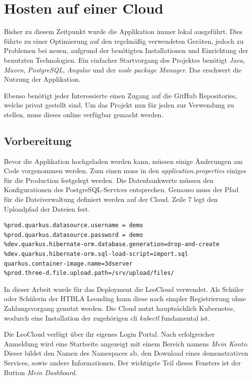 \section{Hosten auf einer Cloud}

Bisher zu diesem Zeitpunkt wurde die Applikation immer lokal ausgeführt. 
Dies führte zu einer Optimierung auf den regelmäßig verwendeten Geräten, jedoch zu Problemen bei neuen, aufgrund der benötigten Installationen und Einrichtung der benutzten Technologien. 
Ein einfacher Startvorgang des Projektes benötigt \emph{Java}, \emph{Maven}, \emph{PostgreSQL}, \emph{Angular} und der \emph{node package Manager}.
Das erschwert die Nutzung der Applikation. 

Ebenso benötigt jeder Interessierte einen Zugang auf die GitHub Repositories, welche privat gestellt sind. 
Um das Projekt nun für jeden zur Verwendung zu stellen, muss dieses online verfügbar gemacht werden. 

\subsection{Vorbereitung}

Bevor die Applikation hochgeladen werden kann, müssen einige Änderungen am Code vorgenommen werden. 
Zum einen muss in den \emph{application.properties} einiges für die Production festgelegt werden. 
Die Datenbankwerte müssen den Konfigurationen des PostgreSQL-Services entsprechen. 
Genauso muss der Pfad für die Dateiverwaltung definiert werden auf der Cloud.
Zeile 7 legt den Uploadpfad der Dateien fest.
\begin{lstlisting}[label=lst:dbconfProd, caption=application.properties für Produktion]
%prod.quarkus.datasource.jdbc.url=jdbc:postgresql://postgres:5432/demo
%prod.quarkus.datasource.username = demo
%prod.quarkus.datasource.password = demo
%dev.quarkus.hibernate-orm.database.generation=drop-and-create
%dev.quarkus.hibernate-orm.sql-load-script=import.sql
quarkus.container-image.name=3dserver
%prod.three-d.file.upload.path=/srv/upload/files/
\end{lstlisting}    

In dieser Arbeit wurde für das Deployment die LeoCloud verwendet. 
Als Schüler oder Schülerin der HTBLA Leonding kann diese nach simpler Registrierung ohne Zahlungsvorgang genutzt werden. 
Die Cloud nutzt hauptsächlich Kubernetes, wodurch eine Installation der zugehörigen \gls{cli} \emph{kubectl} fundamental ist. 

Die LeoCloud verfügt über ihr eigenes Login Portal. 
Nach erfolgreicher Anmeldung wird eine Startseite angezeigt mit einem Bereich namens \emph{Mein Konto}. 
Dieser bildet den Namen des Namespaces ab, den Download eines demonstrativen Services, sowie andere Informationen. 
Der wichtigste Teil dieses Fensters ist der Button \emph{Mein Dashboard}. 

